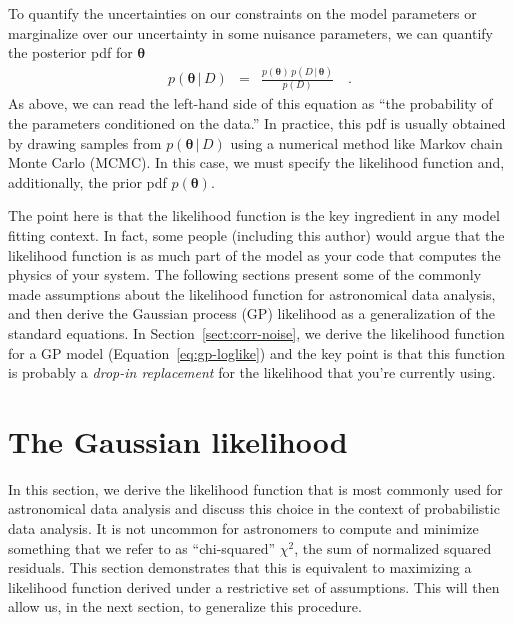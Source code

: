 \documentclass[modern, letterpaper]{aastex61}
\renewcommand{\eqref}[1]{\ref{eq:#1}}
\newcommand{\eqalt}[1]{Equation~\eqref{#1}}
\newcommand{\sectionname}{Section}
\newcommand{\sectref}[1]{\ref{sect:#1}}
\newcommand{\Sect}[1]{\sectionname~\sectref{#1}}
\newcommand{\sect}[1]{\Sect{#1}}
\newcommand{\bvec}[1]{{\ensuremath{\boldsymbol{#1}}}}
\begin{document}
To quantify the uncertainties on our constraints on the model parameters or
marginalize over our uncertainty in some nuisance parameters, we can quantify
the posterior pdf for $\bvec{\theta}$
\begin{eqnarray}
p(\bvec{\theta}\,|\,D) &=&
    \frac{p(\bvec{\theta})\,p(D\,|\,\bvec{\theta})}{p(D)} \quad.
\end{eqnarray}
As above, we can read the left-hand side of this equation as ``the probability
of the parameters conditioned on the data.''
In practice, this pdf is usually obtained by drawing samples from
$p(\bvec{\theta}\,|\,D)$ using a numerical method like Markov chain Monte
Carlo (MCMC).
In this case, we must specify the likelihood function and, additionally, the
prior pdf $p(\bvec{\theta})$.

The point here is that the likelihood function is the key ingredient in any
model fitting context.
In fact, some people (including this author) would argue that the likelihood
function is as much part of the model as your code that computes the physics
of your system.
The following sections present some of the commonly made assumptions about the
likelihood function for astronomical data analysis, and then derive the
Gaussian process (GP) likelihood as a generalization of the standard
equations.
In \sect{corr-noise}, we derive the likelihood function for a GP model
(\eqalt{gp-loglike}) and the key point is that this function is probably a
\emph{drop-in replacement} for the likelihood that you're currently using.

\section{The Gaussian likelihood}

In this section, we derive the likelihood function that is most commonly used
for astronomical data analysis and discuss this choice in the context of
probabilistic data analysis.
It is not uncommon for astronomers to compute and minimize something that we
refer to as ``chi-squared'' $\chi^2$, the sum of normalized squared residuals.
This section demonstrates that this is equivalent to maximizing a likelihood
function derived under a restrictive set of assumptions.
This will then allow us, in the next section, to generalize this procedure.
\end{document}
